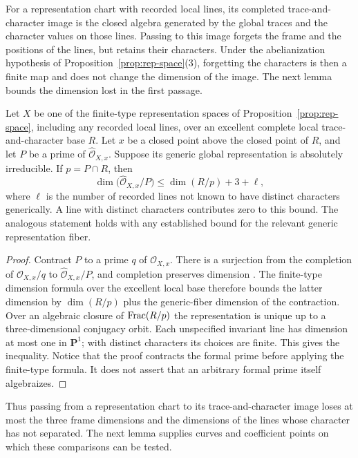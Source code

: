 For a representation chart with recorded local lines, its completed
trace-and-character image is the closed algebra generated by the global
traces and the character values on those lines. Passing to this image
forgets the frame and the positions of the lines, but retains their
characters. Under the abelianization hypothesis of
Proposition~\ref{prop:rep-space}(3), forgetting the characters is then
a finite map and does not change the dimension of the image. The next
lemma bounds the dimension lost in the first passage.

\begin{lemma}\label{lem:dimension-comparison}
Let $X$ be one of the finite-type representation spaces of
Proposition~\ref{prop:rep-space}, including any recorded local lines,
over an excellent complete local trace-and-character base $R$.  Let
$x$ be a closed point above the closed point of $R$, and let $P$ be a
prime of $\widehat{\mathcal O}_{X,x}$.  Suppose its generic global
representation is absolutely irreducible.  If $p=P\cap R$, then
\[
\dim\bigl(\widehat{\mathcal O}_{X,x}/P\bigr)
 \leq \dim(R/p)+3+\ell,
\]
where $\ell$ is the number of recorded lines not known to have
distinct characters generically.  A line with distinct characters
contributes zero to this bound.  The analogous statement holds with
any established bound for the relevant generic representation fiber.
\end{lemma}

\begin{proof}
Contract $P$ to a prime $q$ of $\mathcal O_{X,x}$.  There is a
surjection from the completion of $\mathcal O_{X,x}/q$ to
$\widehat{\mathcal O}_{X,x}/P$, and completion preserves dimension
\cite[Tags~02IJ and~07NV]{StacksProject}.
The finite-type dimension formula over the excellent local base
therefore bounds the latter dimension by $\dim(R/p)$ plus the
generic-fiber dimension of the contraction.  Over an algebraic closure
of $\operatorname{Frac}(R/p)$ the representation is unique up to a three-dimensional
conjugacy orbit.  Each unspecified invariant line has dimension at most
one in $\mathbf P^1$; with distinct characters its choices are finite.
This gives the inequality.  Notice that the proof contracts the formal
prime before applying the finite-type formula.  It does not assert
that an arbitrary formal prime itself algebraizes.
\end{proof}

Thus passing from a representation chart to its trace-and-character
image loses at most the three frame dimensions and the dimensions
of the lines whose character has not separated. The next lemma
supplies curves and coefficient points on which these comparisons
can be tested.

